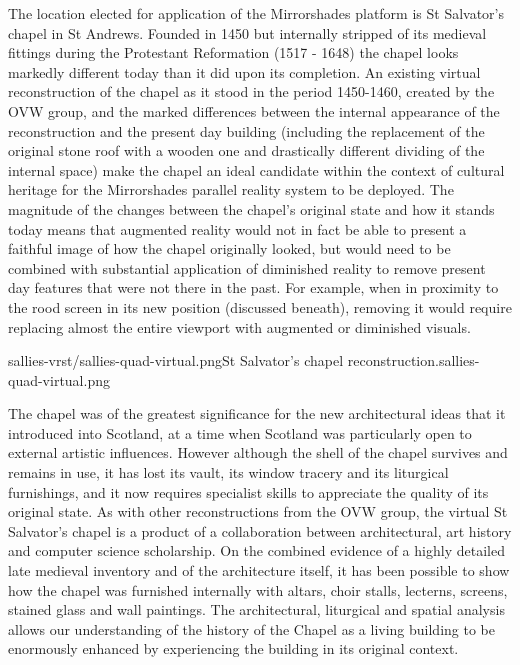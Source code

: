 The location elected for application of the Mirrorshades platform is St Salvator's chapel in St Andrews. Founded in 1450 but internally stripped of its medieval fittings during the Protestant Reformation (1517 - 1648) the chapel looks markedly different today than it did upon its completion. An existing virtual reconstruction of the chapel as it stood in the period 1450-1460, created by the OVW group, and the marked differences between the internal appearance of the reconstruction and the present day building (including the replacement of the original stone roof with a wooden one and drastically different dividing of the internal space) make the chapel an ideal candidate within the context of cultural heritage for the Mirrorshades parallel reality system to be deployed. The magnitude of the changes between the chapel's original state and how it stands today means that augmented reality would not in fact be able to present a faithful image of how the chapel originally looked, but would need to be combined with substantial application of diminished reality to remove present day features that were not there in the past. For example, when in proximity to the rood screen in its new position (discussed beneath), removing it would require replacing almost the entire viewport with augmented or diminished visuals.

       {sallies-vrst/sallies-quad-virtual.png}{St Salvator's chapel reconstruction.}{sallies-quad-virtual.png}
       
The chapel was of the greatest significance for the new architectural ideas that it introduced into Scotland, at a time when Scotland was particularly open to external artistic influences. However although the shell of the chapel survives and remains in use, it has lost its vault, its window tracery and its liturgical furnishings, and it now requires specialist skills to appreciate the quality of its original state. As with other reconstructions from the OVW group, the virtual St Salvator's chapel is a product of a collaboration between architectural, art history and computer science scholarship. On the combined evidence of a highly detailed late medieval inventory and of the architecture itself, it has been possible to show how the chapel was furnished internally with altars, choir stalls, lecterns, screens, stained glass and wall paintings. The architectural, liturgical and spatial analysis allows our understanding of the history of the Chapel as a living building to be enormously enhanced by experiencing the building in its original context.

